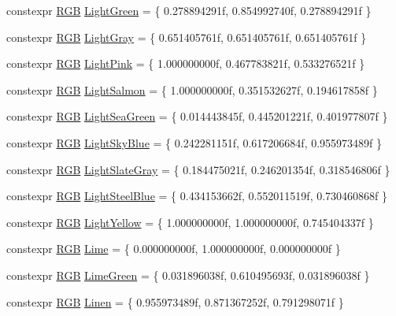 \begin{DoxyCompactItemize}
constexpr \hyperlink{structmage_1_1_r_g_b}{R\+GB} \hyperlink{namespacemage_1_1color_a8229e71bb1cae46b47e2c415ac4b43ea}{Light\+Green} = \{ 0.\+278894291f, 0.\+854992740f, 0.\+278894291f \}
\item 
constexpr \hyperlink{structmage_1_1_r_g_b}{R\+GB} \hyperlink{namespacemage_1_1color_aadf052403392216e671d0ac1b18d1909}{Light\+Gray} = \{ 0.\+651405761f, 0.\+651405761f, 0.\+651405761f \}
\item 
constexpr \hyperlink{structmage_1_1_r_g_b}{R\+GB} \hyperlink{namespacemage_1_1color_a2211bc4700514d59df25b53387aa1d32}{Light\+Pink} = \{ 1.\+000000000f, 0.\+467783821f, 0.\+533276521f \}
\item 
constexpr \hyperlink{structmage_1_1_r_g_b}{R\+GB} \hyperlink{namespacemage_1_1color_a0ea813bec32974b56714ee519d3fd738}{Light\+Salmon} = \{ 1.\+000000000f, 0.\+351532627f, 0.\+194617858f \}
\item 
constexpr \hyperlink{structmage_1_1_r_g_b}{R\+GB} \hyperlink{namespacemage_1_1color_a1e3d4448a15e0fac347da747ad2647a2}{Light\+Sea\+Green} = \{ 0.\+014443845f, 0.\+445201221f, 0.\+401977807f \}
\item 
constexpr \hyperlink{structmage_1_1_r_g_b}{R\+GB} \hyperlink{namespacemage_1_1color_a9fd52a16c2c4ace303c2e1d6d33556af}{Light\+Sky\+Blue} = \{ 0.\+242281151f, 0.\+617206684f, 0.\+955973489f \}
\item 
constexpr \hyperlink{structmage_1_1_r_g_b}{R\+GB} \hyperlink{namespacemage_1_1color_a03509d568368a4918213130a9f44f55c}{Light\+Slate\+Gray} = \{ 0.\+184475021f, 0.\+246201354f, 0.\+318546806f \}
\item 
constexpr \hyperlink{structmage_1_1_r_g_b}{R\+GB} \hyperlink{namespacemage_1_1color_a5ecb57996411f6b8927bfafb204208a3}{Light\+Steel\+Blue} = \{ 0.\+434153662f, 0.\+552011519f, 0.\+730460868f \}
\item 
constexpr \hyperlink{structmage_1_1_r_g_b}{R\+GB} \hyperlink{namespacemage_1_1color_a46b3fdd57b6933a6bafb704682e82518}{Light\+Yellow} = \{ 1.\+000000000f, 1.\+000000000f, 0.\+745404337f \}
\item 
constexpr \hyperlink{structmage_1_1_r_g_b}{R\+GB} \hyperlink{namespacemage_1_1color_ad30a72922fc74a93b1d86e6da0fe3edb}{Lime} = \{ 0.\+000000000f, 1.\+000000000f, 0.\+000000000f \}
\item 
constexpr \hyperlink{structmage_1_1_r_g_b}{R\+GB} \hyperlink{namespacemage_1_1color_a164223d6970354e460665eaf3d163d47}{Lime\+Green} = \{ 0.\+031896038f, 0.\+610495693f, 0.\+031896038f \}
\item 
constexpr \hyperlink{structmage_1_1_r_g_b}{R\+GB} \hyperlink{namespacemage_1_1color_add4a34c183b39c88f3e4ff8d627f5637}{Linen} = \{ 0.\+955973489f, 0.\+871367252f, 0.\+791298071f \}

\end{DoxyCompactItemize}
